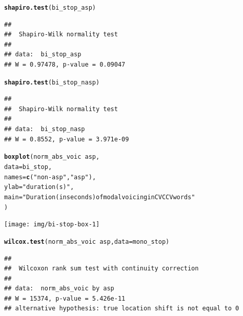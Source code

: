 \documentclass[a4paper,11pt]{article}\usepackage[]{graphicx}\usepackage[]{color}
\makeatletter
\newcommand{\hlstr}[1]{\textcolor[rgb]{0.192,0.494,0.8}{#1}}%
\newcommand{\hlopt}[1]{\textcolor[rgb]{0,0,0}{#1}}%
\newcommand{\hlstd}[1]{\textcolor[rgb]{0.345,0.345,0.345}{#1}}%
\newcommand{\hlkwc}[1]{\textcolor[rgb]{0.333,0.667,0.333}{#1}}%
\newcommand{\hlkwd}[1]{\textcolor[rgb]{0.737,0.353,0.396}{\textbf{#1}}}%
\newenvironment{kframe}{%
 \def\at@end@of@kframe{}%
 \ifinner\ifhmode%
  \def\at@end@of@kframe{\end{minipage}}%
  \begin{minipage}{\columnwidth}%
 \fi\fi%
 \def\FrameCommand##1{\hskip\@totalleftmargin \hskip-\fboxsep
 \colorbox{shadecolor}{##1}\hskip-\fboxsep
     \hskip-\linewidth \hskip-\@totalleftmargin \hskip\columnwidth}%
 \MakeFramed {\advance\hsize-\width
   \@totalleftmargin\z@ \linewidth\hsize
   \@setminipage}}%
 {\par\unskip\endMakeFramed%
 \at@end@of@kframe}
\newenvironment{knitrout}{}{} %
\makeatother
\begin{document}
\begin{knitrout}
\color{fgcolor}\begin{kframe}
\begin{alltt}
\hlkwd{shapiro.test}\hlstd{(bi_stop_asp)}
\end{alltt}
\begin{verbatim}
## 
## 	Shapiro-Wilk normality test
## 
## data:  bi_stop_asp
## W = 0.97478, p-value = 0.09047
\end{verbatim}
\begin{alltt}
\hlkwd{shapiro.test}\hlstd{(bi_stop_nasp)}
\end{alltt}
\begin{verbatim}
## 
## 	Shapiro-Wilk normality test
## 
## data:  bi_stop_nasp
## W = 0.8552, p-value = 3.971e-09
\end{verbatim}
\end{kframe}
\end{knitrout}

\begin{knitrout}
\color{fgcolor}\begin{kframe}
\begin{alltt}
\hlkwd{boxplot}\hlstd{(norm_abs_voic} \hlopt{~} \hlstd{asp,}
        \hlkwc{data} \hlstd{= bi_stop,}
        \hlkwc{names} \hlstd{=} \hlkwd{c}\hlstd{(}\hlstr{"non-asp"}\hlstd{,} \hlstr{"asp"}\hlstd{),}
        \hlkwc{ylab} \hlstd{=} \hlstr{"duration (s)"}\hlstd{,}
        \hlkwc{main} \hlstd{=} \hlstr{"Duration (in seconds) of modal voicing in CVCCV words"}
        \hlstd{)}
\end{alltt}
\end{kframe}

{\centering \texttt{[image: img/bi-stop-box-1]} 

}



\end{knitrout}

\begin{knitrout}
\color{fgcolor}\begin{kframe}
\begin{alltt}
\hlkwd{wilcox.test}\hlstd{(norm_abs_voic} \hlopt{~} \hlstd{asp,} \hlkwc{data} \hlstd{= mono_stop)}
\end{alltt}
\begin{verbatim}
## 
## 	Wilcoxon rank sum test with continuity correction
## 
## data:  norm_abs_voic by asp
## W = 15374, p-value = 5.426e-11
## alternative hypothesis: true location shift is not equal to 0
\end{verbatim}
\end{kframe}
\end{knitrout}
\end{document}
